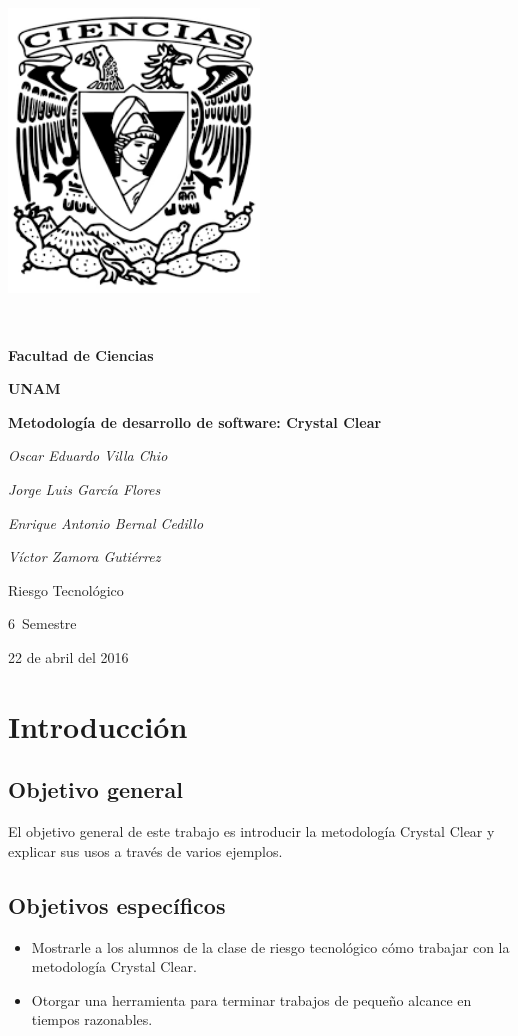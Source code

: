 \documentclass[12pt,a4paper]{article}
\begin{document}
\begin{titlepage}
	\centering
	\includegraphics[width=0.5\textwidth]{./images/logo_ciencias}\par\
	{\LARGE\bf Facultad de Ciencias \par}
	{\LARGE\bf UNAM \par}
	\vspace{1cm}
	{\huge\bfseries Metodolog\'ia de desarrollo de software: Crystal Clear\par}
	\vspace{2cm}
	{\Large\itshape Oscar Eduardo Villa Chio\par}
	{\Large\itshape Jorge Luis Garc\'ia Flores\par}
	{\Large\itshape Enrique Antonio Bernal Cedillo\par}
	{\Large\itshape V\'ictor Zamora Guti\'errez\par}
	\vspace{0.5cm}
	{\large Riesgo Tecnol\'ogico\par 6\textdegree \ Semestre\par}
	{\large 22 de abril del 2016}
\end{titlepage}
\section{Introducci\'on}
\subsection{Objetivo general}
El objetivo general de este trabajo es introducir la metodolog\'ia Crystal Clear y explicar sus usos a trav\'es de varios ejemplos.
\subsection{Objetivos espec\'ificos}
\begin{itemize}
\item Mostrarle a los alumnos de la clase de riesgo tecnol\'ogico c\'omo trabajar con la metodolog\'ia Crystal Clear.
\item Otorgar una herramienta para terminar trabajos de peque\~no alcance en tiempos razonables.
\end{itemize}
\end{document}
